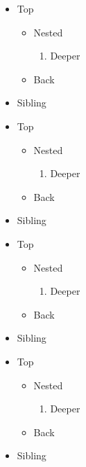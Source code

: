 \begin{itemize}
\item Top
\begin{itemize}
\item Nested
\begin{enumerate}
\item Deeper
\end{enumerate}
\item Back
\end{itemize}
\item Sibling
\end{itemize}
\begin{itemize}
\item Top
\begin{itemize}
\item Nested
\begin{enumerate}
\item Deeper
\end{enumerate}
\item Back
\end{itemize}
\item Sibling
\end{itemize}
\begin{itemize}
\item Top
\begin{itemize}
\item Nested
\begin{enumerate}
\item Deeper
\end{enumerate}
\item Back
\end{itemize}
\item Sibling
\end{itemize}
\begin{frame}[t]
\begin{itemize}
\item Top
\begin{itemize}
\item Nested
\begin{enumerate}
\item Deeper
\end{enumerate}
\item Back
\end{itemize}
\item Sibling
\end{itemize}
\end{frame}

